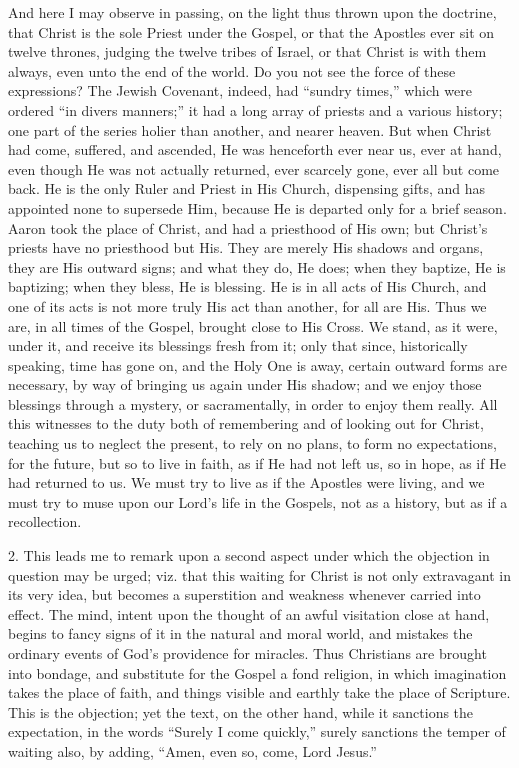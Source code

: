 And here I may observe in passing, on the light thus thrown upon
the doctrine, that Christ is the sole Priest under the Gospel, or that
the Apostles ever sit on twelve thrones, judging the twelve tribes of
Israel, or that Christ is with them always, even unto the end of the
world. Do you not see the force of these expressions? The Jewish
Covenant, indeed, had ``sundry times,'' which were ordered
``in divers manners;'' it had a long array of priests and a
various history; one part of the series holier than another, and
nearer heaven. But when Christ had come, suffered, and ascended, He
was henceforth ever near us, ever at hand, even though He was not
actually returned, ever scarcely gone, ever all but come back. He is
the only Ruler and Priest in His Church, dispensing gifts, and has
appointed none to supersede Him, because He is departed only for a
brief season. Aaron took the place of Christ, and had a priesthood of
His own; but Christ's priests have no priesthood but His. They are
merely His shadows and organs, they are His outward signs; and what
they do, He does; when they baptize, He is baptizing; when they bless,
He is blessing. He is in all acts of His Church, and one of its acts
is not more truly His act than another, for all are His. Thus we are,
in all times of the Gospel, brought close to His Cross. We stand, as
it were, under it, and receive its blessings fresh from it; only that
since, historically speaking, time has gone on, and the Holy One is
away, certain outward forms are necessary, by way of bringing us again
under His shadow; and we enjoy those blessings through a mystery, or
sacramentally, in order to enjoy them really. All this witnesses to
the duty both of remembering and of looking out for Christ, teaching
us to neglect the present, to rely on no plans, to form no
expectations, for the future, but so to live in faith, as if He had
not left us, so in hope, as if He had returned to us. We must try to
live as if the Apostles were living, and we must try to muse upon our
Lord's life in the Gospels, not as a history, but as if a
recollection.

2. This leads me to remark upon a second aspect under which the
objection in question may be urged; viz. that this waiting for Christ
is not only extravagant in its very idea, but becomes a superstition
and weakness whenever carried into effect. The mind, intent upon the
thought of an awful visitation close at hand, begins to fancy signs of
it in the natural and moral world, and mistakes the ordinary events of
God's providence for miracles. Thus Christians are brought into
bondage, and substitute for the Gospel a fond religion, in which
imagination takes the place of faith, and things visible and earthly
take the place of Scripture. This is the objection; yet the text, on
the other hand, while it sanctions the expectation, in the words
``Surely I come quickly,'' surely sanctions the temper of
waiting also, by adding, ``Amen, even so, come, Lord Jesus.''

